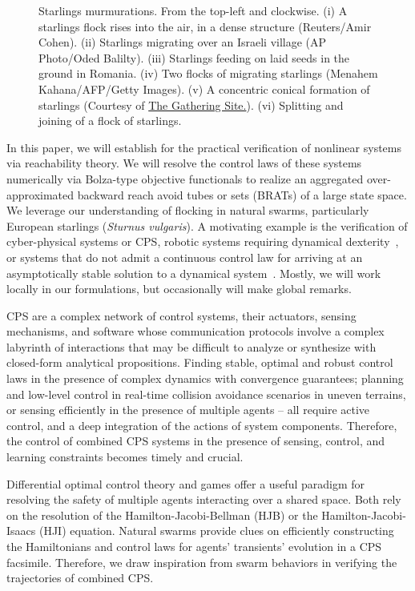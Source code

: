 \begin{figure}[tb!]
\begin{tabular}{ccc}
	\end{tabular}
	\caption{Starlings murmurations. From the top-left and clockwise. (i) A starlings flock rises into the air, in a dense structure (Reuters/Amir Cohen).  (ii) Starlings migrating over an Israeli village (AP Photo/Oded Balilty). (iii) Starlings feeding on laid seeds  in the ground in Romania. (iv) Two flocks of migrating starlings (Menahem Kahana/AFP/Getty Images). (v) A concentric conical formation of starlings (Courtesy of \href{http://www.thegatheringsite.net/qcgems/2014/1/24/murmuration}{The Gathering Site.}). (vi)  Splitting and joining of a flock of starlings.} 
	\label{fig:murmurations}
\end{figure}

In this paper, we will establish  
for the practical verification of nonlinear systems via reachability theory. We will resolve the control laws of these systems numerically via Bolza-type objective functionals to realize an aggregated over-approximated backward reach avoid tubes or sets (BRATs) of a large state space. We leverage our understanding of flocking in natural swarms, particularly European starlings (\textit{Sturnus vulgaris}). A motivating example is the verification of cyber-physical systems or CPS, robotic systems requiring dynamical dexterity~\cite{SeqCompKoditschek}, or  systems that do not admit a continuous control law for arriving at an asymptotically stable solution to a dynamical system~\cite{Brockett83}.  Mostly, we will work locally in our formulations, but occasionally will make global remarks. 

CPS are  a complex network of control systems, their actuators, sensing mechanisms, and software whose communication protocols involve a complex labyrinth of interactions that may be difficult to analyze or synthesize with closed-form analytical propositions.   Finding stable, optimal and robust control laws in the presence of complex dynamics with convergence guarantees; planning and low-level control in real-time collision avoidance scenarios in uneven terrains, or sensing efficiently in the presence of multiple agents -- all require active control, and a deep integration of the actions of system components.  Therefore,  the control of combined CPS systems in the presence of sensing, control, and learning constraints becomes timely and crucial. 

Differential optimal control theory and games offer a useful paradigm for resolving the safety of multiple agents interacting over a shared space. Both rely on the resolution of the Hamilton-Jacobi-Bellman (HJB) or the Hamilton-Jacobi-Isaacs (HJI) equation.  Natural swarms provide clues on efficiently constructing the Hamiltonians and control laws for agents' transients' evolution in a CPS facsimile. Therefore, we draw inspiration from swarm behaviors in verifying the trajectories of combined CPS.

